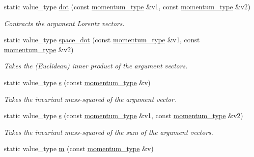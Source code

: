 \begin{DoxyCompactItemize}
\item 
\hypertarget{a00442_a85e7dff8f86c926703770d613d50b994}{static value\-\_\-type \hyperlink{a00442_a85e7dff8f86c926703770d613d50b994}{dot} (const \hyperlink{a00559}{momentum\-\_\-type} \&v1, const \hyperlink{a00559}{momentum\-\_\-type} \&v2)}\label{a00442_a85e7dff8f86c926703770d613d50b994}

\begin{DoxyCompactList}\small\item\em Contracts the argument Lorentz vectors. \end{DoxyCompactList}\item 
\hypertarget{a00442_ab5e639edbafd4b4d3e57e935d9b0bd5e}{static value\-\_\-type \hyperlink{a00442_ab5e639edbafd4b4d3e57e935d9b0bd5e}{space\-\_\-dot} (const \hyperlink{a00559}{momentum\-\_\-type} \&v1, const \hyperlink{a00559}{momentum\-\_\-type} \&v2)}\label{a00442_ab5e639edbafd4b4d3e57e935d9b0bd5e}

\begin{DoxyCompactList}\small\item\em Takes the (Euclidean) inner product of the argument vectors. \end{DoxyCompactList}\item 
\hypertarget{a00442_a001116beb90eeda48f7cb668f67c8995}{static value\-\_\-type \hyperlink{a00442_a001116beb90eeda48f7cb668f67c8995}{s} (const \hyperlink{a00559}{momentum\-\_\-type} \&v)}\label{a00442_a001116beb90eeda48f7cb668f67c8995}

\begin{DoxyCompactList}\small\item\em Takes the invariant mass-\/squared of the argument vector. \end{DoxyCompactList}\item 
\hypertarget{a00442_a9d16152b17353661ccb6e1f03047da8e}{static value\-\_\-type \hyperlink{a00442_a9d16152b17353661ccb6e1f03047da8e}{s} (const \hyperlink{a00559}{momentum\-\_\-type} \&v1, const \hyperlink{a00559}{momentum\-\_\-type} \&v2)}\label{a00442_a9d16152b17353661ccb6e1f03047da8e}

\begin{DoxyCompactList}\small\item\em Takes the invariant mass-\/squared of the sum of the argument vectors. \end{DoxyCompactList}\item 
\hypertarget{a00442_a3a9390d5b0f36b7778161963c43843b0}{static value\-\_\-type \hyperlink{a00442_a3a9390d5b0f36b7778161963c43843b0}{m} (const \hyperlink{a00559}{momentum\-\_\-type} \&v)}\label{a00442_a3a9390d5b0f36b7778161963c43843b0}


\end{DoxyCompactItemize}
